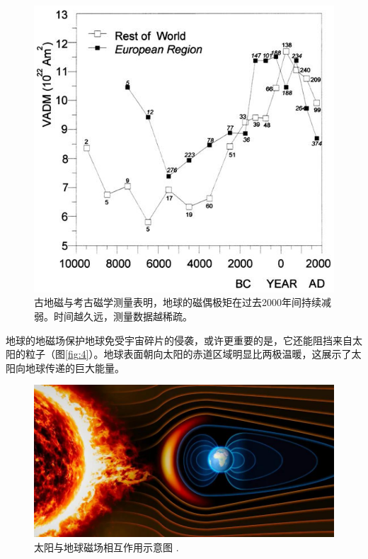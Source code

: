 \documentclass[10pt,twocolumn,letterpaper]{article}
\begin{document}
\begin{figure}[t]
\begin{center}
   \includegraphics[width=1\linewidth]{paleo.png}
\end{center}
   \caption{古地磁与考古磁学测量表明，地球的磁偶极矩在过去2000年间持续减弱。时间越久远，测量数据越稀疏。 \cite{11}}
\label{fig:3}
\label{fig:onecol}
\end{figure}
地球的地磁场保护地球免受宇宙碎片的侵袭，或许更重要的是，它还能阻挡来自太阳的粒子（图\ref{fig:4}）。地球表面朝向太阳的赤道区域明显比两极温暖，这展示了太阳向地球传递的巨大能量。

\begin{figure}[t]
\begin{center}
   \includegraphics[width=1\linewidth]{solargeo.jpg}
\end{center}
   \caption{太阳与地球磁场相互作用示意图 \cite{10}.}
\label{fig:4}
\label{fig:onecol}
\end{figure}
\end{document}
